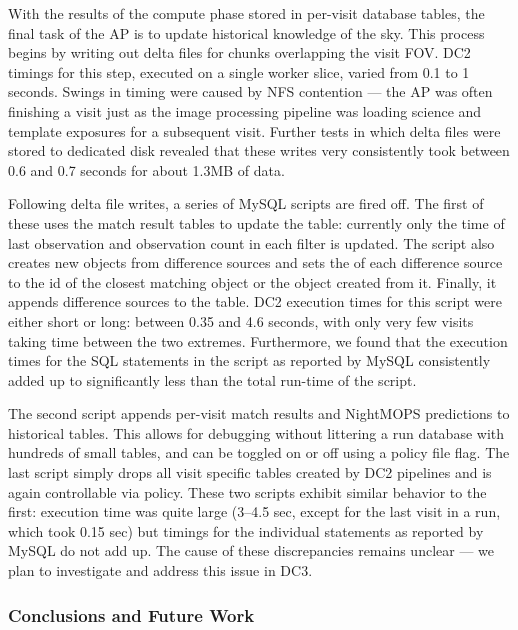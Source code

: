 With the results of the compute phase stored in per-visit database tables, the
final task of the AP is to update historical knowledge of the sky. This
process begins by writing out delta files for chunks overlapping the
visit FOV. DC2 timings for this step, executed on a single worker slice,
varied from 0.1 to 1 seconds. Swings in timing were caused by NFS contention ---
the AP was often finishing a visit just as the image processing pipeline was
loading science and template exposures for a subsequent visit. Further tests
in which delta files were stored to dedicated disk revealed that these writes
very consistently took between 0.6 and 0.7 seconds for about 1.3MB of data.

Following delta file writes, a series of MySQL scripts are fired off. The
first of these uses the match result tables to update the  table:
currently only the time of last observation and observation count in each
filter is updated. The script also creates new objects from difference sources
and sets the  of each difference source to the id of the
closest matching object or the object created from it. Finally, it appends
difference sources to the  table. DC2 execution times for this
script were either short or long: between 0.35 and 4.6 seconds, with only
very few visits taking time between the two extremes. Furthermore, we found
that the execution times for the SQL statements in the script as reported by
MySQL consistently added up to significantly less than the total run-time of
the script.

The second script appends per-visit match results and NightMOPS predictions 
to historical tables. This allows for debugging without littering a run
database with hundreds of small tables, and can be toggled on or off using a
policy file flag. The last script simply drops all visit specific tables
created by DC2 pipelines and is again controllable via policy. These two
scripts exhibit similar behavior to the first: execution time was quite large
(3--4.5 sec, except for the last visit in a run, which took 0.15 sec) but
timings for the individual statements as reported by MySQL do not add up. The
cause of these discrepancies remains unclear --- we plan to investigate and
address this issue in DC3.

\subsubsection{Conclusions and Future Work}

